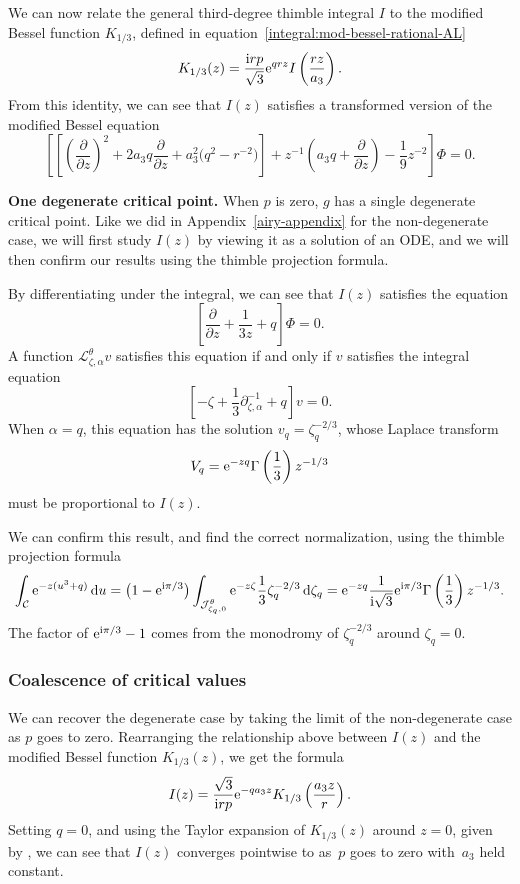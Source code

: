 \documentclass[pdftex]{sigma}
\newcommand{\laplace}{\mathcal{L}}
\numberwithin{equation}{section}
\begin{document}
We can now relate the general third-degree thimble integral $I$ to the modified Bessel function $K_{1/3}$, defined in equation~\eqref{integral:mod-bessel-rational-AL}
\[
K_{1/3}(z) = \frac{{\rm i}rp}{\sqrt{3}} {\rm e}^{qrz} I\left(\frac{rz}{a_3}\right).
\]
From this identity, we can see that $I(z)$ satisfies a transformed version of the modified Bessel equation
\[ \left[ \left[\left(\frac{\partial}{\partial z}\right)^2 + 2a_3 q \frac{\partial}{\partial z} + a_3^2 \big(q^2 - r^{-2}\big)\right] + z^{-1} \left(a_3 q + \frac{\partial}{\partial z}\right) - \frac{1}{9} z^{-2} \right] \Phi = 0. \]

\textbf{One degenerate critical point.}
When $p$ is zero, $g$ has a single degenerate critical point. Like we did in Appendix~\ref{airy-appendix} for the non-degenerate case, we will first study $I(z)$ by viewing it as a solution of an ODE, and we will then confirm our results using the thimble projection formula.

By differentiating under the integral, we can see that $I(z)$ satisfies the equation
\[%
\left[\frac{\partial}{\partial z} + \frac{1}{3z} +q \right] \Phi = 0.
\]
A function $\laplace_{\zeta,\alpha}^{\theta} v$ satisfies this equation if and only if $v$ satisfies the integral equation
\[ \left[ -\zeta + \frac{1}{3} \partial^{-1}_{\zeta, \alpha} +q \right] v = 0. \]
When $\alpha = q$, this equation has the solution
$ v_q = \zeta_q^{-2/3}$,
whose Laplace transform
\[ V_q = {\rm e}^{-zq} \Gamma\left(\frac{1}{3}\right) z^{-1/3} \]
must be proportional to $I(z)$.

We can confirm this result, and find the correct normalization, using the thimble projection formula
\begin{align*}
\int_{\mathcal{C}} {\rm e}^{-z(u^3+q)} \, {\rm d}u = \bigl(1 - {\rm e}^{{\rm i}\pi/3}\bigr) \int_{\mathcal{J}_{\zeta_q, 0}^\theta} {\rm e}^{-z\zeta} \frac{1}{3}\zeta_q^{-2/3} \, {\rm d}\zeta_q = {\rm e}^{-zq}\frac{1}{{\rm i}\sqrt{3}} {\rm e}^{{\rm i}\pi/3} \Gamma\left(\frac{1}{3}\right) z^{-1/3}.
\end{align*}
The factor of ${\rm e}^{{\rm i}\pi/3} - 1$ comes from the monodromy of $\zeta_q^{-2/3}$ around $\zeta_q = 0$.

\subsubsection{Coalescence of critical values}
We can recover the degenerate case by taking the limit of the non-degenerate case as $p$ goes to zero. Rearranging the relationship above between $I(z)$ and the modified Bessel function $K_{1/3}(z)$, we get the formula
\[ I(z) = \frac{\sqrt{3}}{{\rm i}rp} {\rm e}^{-qa_3z} K_{1/3}\left(\frac{a_3 z}{r}\right). \]
Setting $q=0$, and using the Taylor expansion of $K_{1/3}(z)$ around $z = 0$, given by \cite[equations~(10.25.2) and~(10.27.4)]{dlmf}, we can see that $I(z)$ converges pointwise to  as~$p$ goes to zero with~$a_3$ held constant.
%
\end{document}
